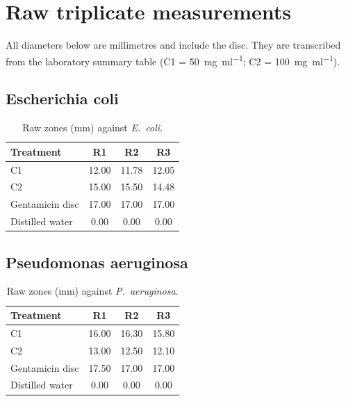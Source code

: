 
\chapter{Raw triplicate measurements}
\label{app:data_template}

All diameters below are millimetres and include the disc. They are transcribed from the laboratory summary table (C1 = \qty{50}{\milli\gram\per\milli\litre}; C2 = \qty{100}{\milli\gram\per\milli\litre}).

\section{Escherichia coli}
\label{sec:app_ecoli}

\begin{table}[htbp]
  \centering
  \caption{Raw zones (mm) against \textit{E.\ coli}.}
  \label{tab:app_ecoli}
  \begin{tabular}{lccc}
    \toprule
    Treatment & R1 & R2 & R3 \\
    \midrule
    C1 & 12.00 & 11.78 & 12.05 \\
    C2 & 15.00 & 15.50 & 14.48 \\
    Gentamicin disc & 17.00 & 17.00 & 17.00 \\
    Distilled water & 0.00 & 0.00 & 0.00 \\
    \bottomrule
  \end{tabular}
\end{table}

\section{Pseudomonas aeruginosa}
\label{sec:app_pa}

\begin{table}[htbp]
  \centering
  \caption{Raw zones (mm) against \textit{P.\ aeruginosa}.}
  \label{tab:app_pa}
  \begin{tabular}{lccc}
    \toprule
    Treatment & R1 & R2 & R3 \\
    \midrule
    C1 & 16.00 & 16.30 & 15.80 \\
    C2 & 13.00 & 12.50 & 12.10 \\
    Gentamicin disc & 17.50 & 17.00 & 17.00 \\
    Distilled water & 0.00 & 0.00 & 0.00 \\
    \bottomrule
  \end{tabular}
\end{table}

